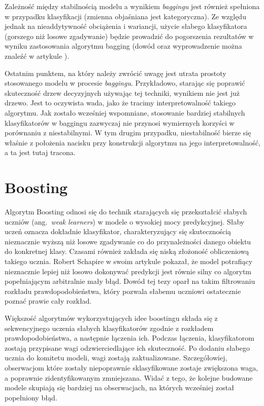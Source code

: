 \documentclass[12pt,a4paper,twoside,openany]{book}
\begin{document}
Zależność między stabilnością modelu a wynikiem \textit{baggingu} jest również spełniona w przypadku klasyfikacji (zmienna objaśniana jest kategoryczna). Ze względu jednak na nieaddytywność obciążenia i wariancji, użycie słabego klasyfikatora (gorszego niż losowe zgadywanie) będzie prowadzić do pogorszenia rezultatów w wyniku zastosowania algorytmu bagging (dowód oraz wyprowadzenie można znaleźć w artykule \citet{breiman1996}).

Ostatnim punktem, na który należy zwrócić uwagę jest utrata prostoty stosowanego modelu w procesie \textit{baggingu}. Przykładowo, starając się poprawić skuteczność drzew decyzyjnych używając tej techniki, wynikiem nie jest już drzewo. Jest to oczywista wada, jako że tracimy interpretowalność takiego algorytmu. Jak zostało wcześniej wspomniane, stosowanie bardziej stabilnych klasyfikatorów w baggingu zazwyczaj nie przynosi wymiernych korzyści w porównaniu z niestabilnymi. W tym drugim przypadku, niestabilność bierze się właśnie z położenia nacisku przy konstrukcji algorytmu na jego interpretowalność, a ta jest tutaj tracona. 

\section{Boosting}

Algorytm Boosting odnosi się do technik starających się przekształcić słabych uczniów (ang.~\textit{weak learners}) w modele o wysokiej mocy predykcyjnej. Słaby uczeń oznacza dokładnie klasyfikator, charakteryzujący się skutecznością nieznacznie wyższą niż losowe zgadywanie co do przynależności danego obiektu do konkretnej klasy. Czasami również zakłada się niską złożoność obliczeniową takiego ucznia. Robert Schapire w swoim artykule \citep{schapire1990} pokazał, że model potrafiący nieznacznie lepiej niż losowo dokonywać predykcji jest równie silny co algorytm popełniającym arbitralnie mały błąd. Dowód tej tezy oparł na takim filtrowaniu rozkładu prawdopodobieństwa, który pozwala słabemu uczniowi ostatecznie poznać prawie cały rozkład.

Większość algorytmów wykorzystujących idee boostingu składa się z sekwencyjnego uczenia słabych klasyfikatorów zgodnie z rozkładem prawdopodobieństwa, a następnie łączenia ich. Podczas łączenia, klasyfikatorom zostają przypisane wagi odzwierciedlające ich skuteczność. Po dodaniu słabego ucznia do komitetu modeli, wagi zostają zaktualizowane. Szczegółowiej, obserwacjom które zostały niepoprawnie sklasyfikowane zostaje zwiększona waga, a poprawnie zidentyfikowanym zmniejszana. Widać z tego, że kolejne budowane modele skupiają się bardziej na obserwacjach, na których wcześniej został popełniony błąd.
\end{document}
